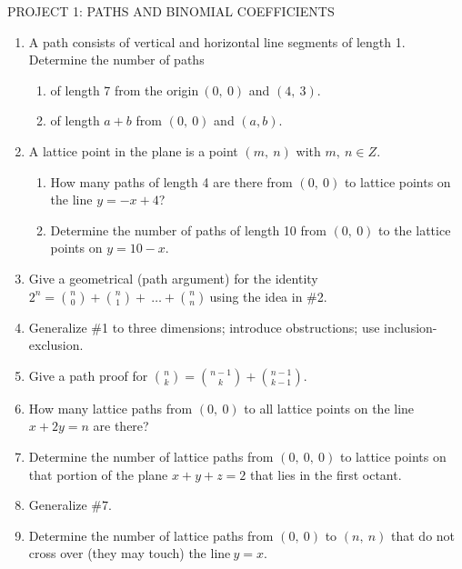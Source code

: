 PROJECT 1: PATHS AND BINOMIAL COEFFICIENTS
\begin{enumerate}
\def\labelenumi{\arabic{enumi}.}

\item
  A path consists of vertical and horizontal line segments of length 1.
  Determine the number of paths
\begin{enumerate}
  \def\labelenumii{\alph{enumii}.}

  \item
    of length 7 from the origin\(\ \left( 0,\ 0 \right)\) and
    \((4,\ 3)\).
  \item
    of length \(a + b\) from \(\left( 0,\ 0 \right)\) and \((a,b)\).

\end{enumerate}
\item
  A lattice point in the plane is a point \((m,\ n)\) with
  \(m,\ n \in Z\).
\begin{enumerate}
  \def\labelenumii{\alph{enumii}.}

  \item
    How many paths of length 4 are there from \((0,\ 0)\) to lattice
    points on the line \(y = - x + 4\)?
  \item
    Determine the number of paths of length 10 from \((0,\ 0)\) to the
    lattice points on \(y = 10 - x\).

\end{enumerate}
\item
  Give a geometrical (path argument) for the identity
  \(2^{n} =
\binom{n}{0}
 +
\binom{n}{1}
 + \ \ldots +
\binom{n}{n}
\ \)using the idea in \#2.
\item
  Generalize \#1 to three dimensions; introduce obstructions; use
  inclusion-exclusion.
\item
  Give a path proof for \(\binom{n}{k}
 =
\binom{n - 1}{k}
 +
\binom{n - 1}{k - 1}
\).
\item
  How many lattice paths from \(\left( 0,\ 0 \right)\) to all lattice
  points on the line \(x + 2y = n\) are there?
\item
  Determine the number of lattice paths from
  \(\left( 0,\ 0,\ 0 \right)\) to lattice points on that portion of the
  plane \(x + y + z = 2\) that lies in the first octant.
\item
  Generalize \#7.
\item
  Determine the number of lattice paths from \(\left( 0,\ 0 \right)\) to
  \((n,\ n)\) that do not cross over (they may touch) the
  line\(\ y = x\).

\end{enumerate}

